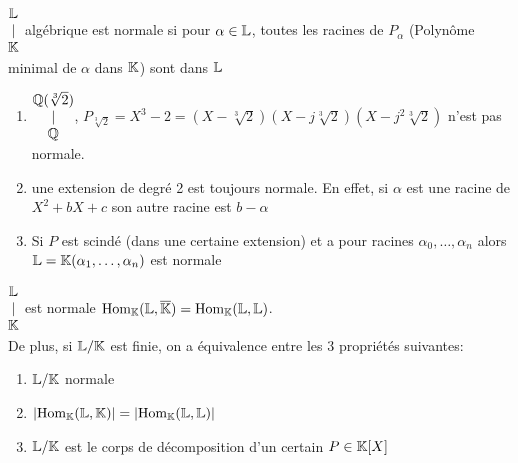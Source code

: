 \documentclass[]{report}
\begin{document}
    \begin{df}{}{}
        $\begin{matrix}
            \mathbb{L}\\
            |\\
            \mathbb{K}
        \end{matrix}$ algébrique est normale si pour $\alpha\in \mathbb{L}$, toutes les racines de $P_\alpha$ (Polynôme minimal de $\alpha$ dans $\mathbb{K}$) sont dans $\mathbb{L}$
    \end{df}

    \begin{ex}{}{}
        \begin{enumerate}
            \item $\begin{matrix}
                \mathbb{Q}(\sqrt[3]{2})\\
                |\\
                \mathbb{Q}
            \end{matrix}$, $P_{\sqrt[3]{2}}=X^3-2=(X-\sqrt[3]{2})(X-j\sqrt[3]{2})(X-j^2\sqrt[3]{2})$ n'est pas normale.
            \item une extension de degré 2 est toujours normale. En effet, si $\alpha$ est une racine de $X^2+bX+c$ son autre racine est $b-\alpha$
            \item Si $P$ est scindé (dans une certaine extension) et a pour racines $\alpha_0,\ldots,\alpha_n$ alors $\mathbb{L}=\mathbb{K}(\alpha_1,\ldots,\alpha_n)$ est normale
        \end{enumerate}
    \end{ex}

    \begin{prop}{}{}
        $\begin{matrix}
            \mathbb{L}\\
            |\\
            \mathbb{K}
        \end{matrix}$ est normale \ssi $\text{Hom}_{\mathbb{K}}(\mathbb{L},\overline{\mathbb{K}})=\text{Hom}_{\mathbb{K}}(\mathbb{L},\mathbb{L})$.\\
        De plus, si $\mathbb{L}/\mathbb{K}$ est finie, on a équivalence entre les 3 propriétés suivantes:
        \begin{enumerate}
            \item $\mathbb{L}/\mathbb{K}$ normale
            \item $|\text{Hom}_{\mathbb{K}}(\mathbb{L},\mathbb{K})|=|\text{Hom}_{\mathbb{K}}(\mathbb{L},\mathbb{L})|$
            \item $\mathbb{L}/\mathbb{K}$ est le corps de décomposition d'un certain $P\in \mathbb{K}[X]$
        \end{enumerate}
    \end{prop}
\end{document}
